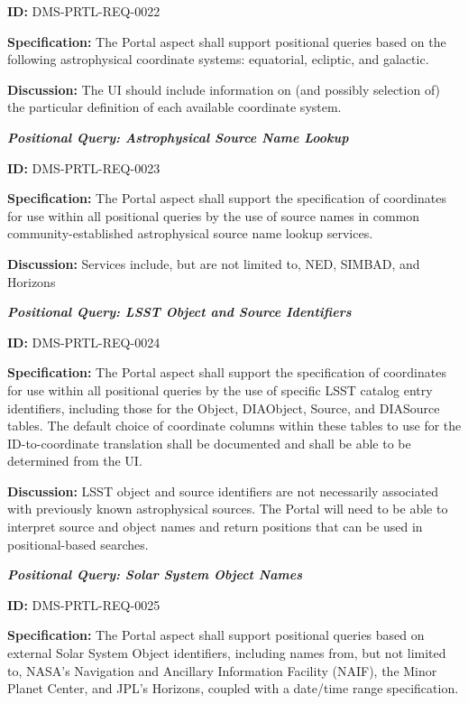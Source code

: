 \documentclass[SE,toc]{lsstdoc}
\begin{document}
\label{DMS-PRTL-REQ-0022}
\textbf{ID:} DMS-PRTL-REQ-0022

\textbf{Specification:}
The Portal aspect shall support positional queries based on the following astrophysical coordinate systems: equatorial, ecliptic, and galactic.

\textbf{Discussion:}
The UI should include information on (and possibly selection of) the particular definition of each available coordinate system.

\textbf{\textit{Positional Query: Astrophysical Source Name Lookup}}

\label{DMS-PRTL-REQ-0023}
\textbf{ID:} DMS-PRTL-REQ-0023

\textbf{Specification:}
The Portal aspect shall support the specification of coordinates for use within all positional queries by the use of source names in common community-established astrophysical source name lookup services.

\textbf{Discussion:}
Services include, but are not limited to, NED, SIMBAD, and Horizons

\textbf{\textit{Positional Query: LSST Object and Source Identifiers}}

\label{DMS-PRTL-REQ-0024}
\textbf{ID:} DMS-PRTL-REQ-0024

\textbf{Specification:}
The Portal aspect shall support the specification of coordinates for use within all positional queries by the use of specific LSST catalog entry identifiers, including those for the Object, DIAObject, Source, and DIASource tables.  The default choice of coordinate columns within these tables to use for the ID-to-coordinate translation shall be documented and shall be able to be determined from the UI.

\textbf{Discussion:}
LSST object and source identifiers are not necessarily associated with previously known astrophysical sources.  The Portal will need to be able to interpret source and object names and return positions that can be used in positional-based searches.

\textbf{\textit{Positional Query: Solar System Object Names}}

\label{DMS-PRTL-REQ-0025}
\textbf{ID:} DMS-PRTL-REQ-0025

\textbf{Specification:}
The Portal aspect shall support positional queries based on external Solar System Object identifiers, including names from, but not limited to, NASA’s Navigation and Ancillary Information Facility (NAIF), the Minor Planet Center, and JPL’s Horizons, coupled with a date/time range specification.
\end{document}
